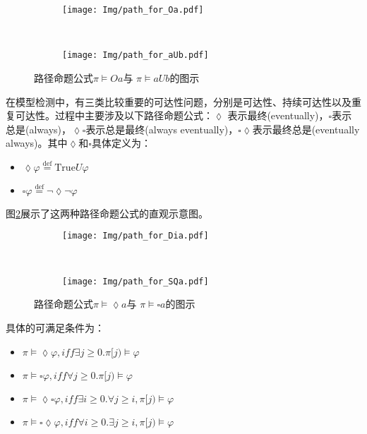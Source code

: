 \begin{figure}[!htbp]
    \centering
    \begin{subfigure}[b]{0.8\textwidth}
        \centering
        \texttt{[image: Img/path\_for\_Oa.pdf]}
    \end{subfigure}
    \\
    \begin{subfigure}{0.8\textwidth}
        \centering
        \texttt{[image: Img/path\_for\_aUb.pdf]}
    \end{subfigure}
    \caption{路径命题公式$\pi\models O a $与 $\pi\models a U b$的图示}
    \label{fig:path-formula-basic}
\end{figure}
在模型检测中，有三类比较重要的可达性问题，分别是可达性、持续可达性以及重复可达性。过程中主要涉及以下路径命题公式：\(\lozenge\) 表示最终(eventually)，\(\square\)表示总是(always)，\(\lozenge\square\)表示总是最终(always eventually)，\(\square\lozenge\)表示最终总是(eventually always)。其中\(\lozenge\)和\(\square\)具体定义为：
\begin{itemize}
    \item \(\lozenge\varphi\overset{\text{def} }{=} \text{True}U\varphi\)
    \item \(\square\varphi\overset{\text{def} }{=} \neg\lozenge\neg\varphi\)
\end{itemize}
图\ref{fig:path-formula}展示了这两种路径命题公式的直观示意图。
\begin{figure}[!htbp]
    \centering
    \begin{subfigure}[b]{0.8\textwidth}
        \centering
        \texttt{[image: Img/path\_for\_Dia.pdf]}
    \end{subfigure}
    \\
    \begin{subfigure}{0.8\textwidth}
        \centering
        \texttt{[image: Img/path\_for\_SQa.pdf]}
    \end{subfigure}
    \caption{路径命题公式$\pi\models\lozenge a$与 $\pi\models\square a$的图示}
    \label{fig:path-formula}
\end{figure}

具体的可满足条件为：
\begin{itemize}
    \item \(\pi\models\lozenge\varphi,iff\exists j\ge0.\pi[j)\models\varphi\)
    \item \(\pi\models\square\varphi,iff\forall j\ge 0.\pi[j)\models\varphi\)
    \item \(\pi\models\lozenge\square\varphi,iff\exists i\ge 0.\forall j\ge i,\pi[j)\models\varphi\)
    \item \(\pi\models\square\lozenge\varphi,iff\forall i\ge 0.\exists j\ge i,\pi[j)\models\varphi\)
\end{itemize}

